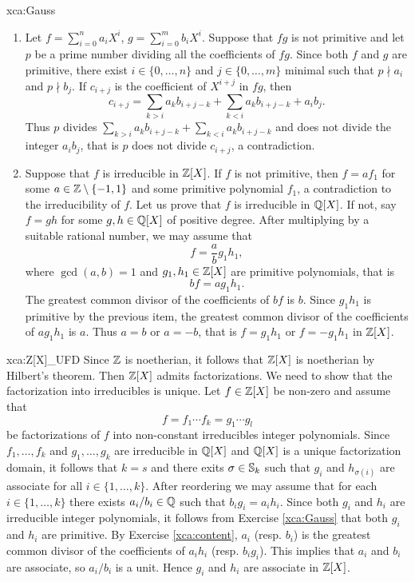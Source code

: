\begin{sol}{xca:Gauss}
\begin{enumerate}
	\item Let $f=\sum_{i=0}^na_iX^i$, $g=\sum_{i=0}^mb_iX^i$. Suppose that 
	$fg$ is not primitive and let $p$ be a prime number dividing all the coefficients  
	of $fg$. Since both $f$ and $g$ are primitive, there exist $i\in\{0,\dots,n\}$ 
 	and $j\in\{0,\dots,m\}$ minimal such that $p\nmid a_i$ and $p\nmid b_j$. 
 	If $c_{i+j}$ is the coefficient of $X^{i+j}$ in $fg$, then  
	\[
 	c_{i+j}=\sum_{k>i}a_kb_{i+j-k}+\sum_{k<i}a_kb_{i+j-k}+a_ib_j.
 	\]
 	Thus $p$ divides $\sum_{k>i}a_kb_{i+j-k}+\sum_{k<i}a_kb_{i+j-k}$ and does not divide
 	the integer $a_ib_j$, that is $p$ does not divide $c_{i+j}$, a contradiction.
	\item Suppose that $f$ is irreducible in $\mathbb{Z}[X]$. If $f$ is not primitive, then
	$f=af_1$ for some $a\in\mathbb{Z}\setminus\{-1,1\}$ and some primitive polynomial $f_1$, a contradiction 
	to the irreducibility of $f$. Let us prove that $f$ is irreducible in $\mathbb{Q}[X]$. If not, say 
	$f=gh$ for some $g,h\in\mathbb{Q}[X]$ of positive degree. After multiplying by a 
	suitable rational number, we may assume that  
	\[
 	f=\frac{a}{b}g_1h_1,
 	\]
 	where $\gcd(a,b)=1$ and $g_1,h_1\in\mathbb{Z}[X]$ are primitive polynomials, that is 
 	\[
 	bf=ag_1h_1.
 	\]
 	The greatest common divisor of the coefficients of $bf$ is $b$. 
	Since $g_1h_1$ is primitive by the previous item, the greatest common divisor 
	of the coefficients of $ag_1h_1$ is $a$. Thus $a=b$ or $a=-b$, 
  	that is $f=g_1h_1$ or $f=-g_1h_1$ in $\mathbb{Z}[X]$.  
\end{enumerate}
\end{sol}

\begin{sol}{xca:Z[X]_UFD}
	Since $\mathbb{Z}$ is noetherian, it follows that $\mathbb{Z}[X]$ is noetherian by Hilbert's theorem. 
	Then $\mathbb{Z}[X]$ admits factorizations. We need to show that the factorization into irreducibles is unique. 
	Let $f\in\mathbb{Z}[X]$ be non-zero and
	assume that 
	\[
	f=f_1\cdots f_k=g_1\cdots g_l
	\]
	be factorizations of $f$ into non-constant irreducibles integer polynomials. Since
	$f_1,\dots,f_k$ and $g_1,\dots,g_k$ 
	are irreducible in $\mathbb{Q}[X]$ and $\mathbb{Q}[X]$ is a unique factorization domain, it follows
	that $k=s$ and there exits $\sigma\in\mathbb{S}_k$ such that $g_i$ and $h_{\sigma(i)}$ are
	associate for all $i\in\{1,\dots,k\}$. After reordering we may assume that 
	for each $i\in\{1,\dots,k\}$ there
	exists $a_i/b_i\in\mathbb{Q}$ such that $b_ig_i=a_ih_i$. Since both $g_i$ and $h_i$ are
	irreducible integer polynomials, it follows from Exercise \ref{xca:Gauss} that
	both $g_i$ and $h_i$ are primitive. By Exercise \ref{xca:content}, 
	$a_i$ (resp. $b_i$) is the greatest common divisor of the coefficients 
	of $a_ih_i$ (resp. $b_ig_i$). This implies that $a_i$ and $b_i$ are associate, so 
	$a_i/b_i$ is a unit. Hence $g_i$ and $h_i$ are associate in $\mathbb{Z}[X]$.     
\end{sol}

